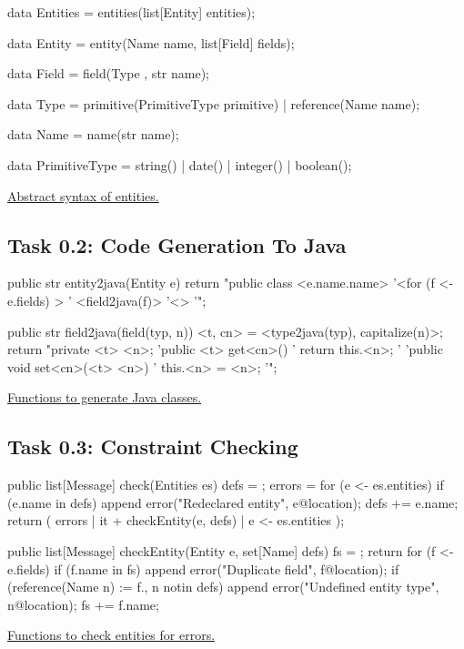 \documentclass[a4paper]{article}
\def\source#1#2{\href{http://svn.rascal-mpl.org/lwc/trunk/lwc11/src/#1}{#2}}
\begin{document}
\begin{listing}
\begin{rascal}
data Entities = entities(list[Entity] entities);
    
data Entity = entity(Name name, list[Field] fields);
    
data Field = field(Type \type, str name);

data Type = primitive(PrimitiveType primitive)
          | reference(Name name);
    
data Name = name(str name);

data PrimitiveType = string() | date() | integer() | boolean();
\end{rascal}
\caption{\source{lang/entities/ast/Entities.rsc}{Abstract syntax of
    entities.}}
\end{listing}


\subsection*{Task 0.2: Code Generation To Java}

\begin{listing}
\begin{rascal}
public str entity2java(Entity e) {
    return "public class <e.name.name> {
        '<for (f <- e.fields) {>
        '  <field2java(f)>
        '<}>
        '}";
}

public str field2java(field(typ, n)) {
    <t, cn> = <type2java(typ), capitalize(n)>;
    return "private <t> <n>;
           'public <t> get<cn>() {
           '    return this.<n>;
           '}
           'public void set<cn>(<t> <n>) {
           '    this.<n> = <n>;
           '}";
}
\end{rascal}
\caption{\source{lang/entities/compile/Entities2Java.rsc}{Functions to
    generate Java classes.}}
\end{listing}

\subsection*{Task 0.3: Constraint Checking}

\begin{listing}
\begin{rascal}
public list[Message] check(Entities es) {
    defs = {};
    errors = for (e <- es.entities) {
        if (e.name in defs) {
            append error("Redeclared entity", e@location);
        }
        defs += {e.name};
    }
    return ( errors | it + checkEntity(e, defs) | e <- es.entities );
}

public list[Message] checkEntity(Entity e, set[Name] defs) {
    fs = {};
    return for (f <- e.fields) {
        if (f.name in fs) {
            append error("Duplicate field", f@location);
        }
        if (reference(Name n) := f.\type, n notin defs) {
            append error("Undefined entity type", n@location);
        }
        fs += {f.name};
    }
}
\end{rascal}
\caption{\source{lang/entities/check/Entities.rsc}{Functions to check
    entities for errors.}}
\end{listing}
\end{document}
